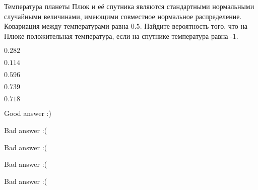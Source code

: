 
\begin{question}
Температура планеты Плюк и её спутника являются стандартными нормальными
случайными величинами, имеющими совместное нормальное распределение.
Ковариация между температурами равна \(0.5\). Найдите вероятность того,
что на Плюке положительная температура, если на спутнике температура
равна -1.
\begin{answerlist}
  \item \(0.282\)
  \item \(0.114\)
  \item \(0.596\)
  \item \(0.739\)
  \item \(0.718\)
\end{answerlist}
\end{question}

\begin{solution}
\begin{answerlist}
  \item Good answer :)
  \item Bad answer :(
  \item Bad answer :(
  \item Bad answer :(
  \item Bad answer :(
\end{answerlist}
\end{solution}


